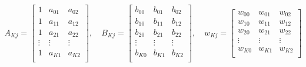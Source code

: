    \begin{align}
   A_{Kj} = \left[\begin{matrix}
   1 			& a_{01} 	& a_{02} \\
   1 			& a_{11} 	& a_{12} \\
   1 			& a_{21} 	& a_{22} \\
   \vdots 		& \vdots 	&  \vdots \\
   1 			& a_{K1} 	& a_{K2} \\
   \end{matrix}
   \right], \quad
      B_{Kj} = \left[\begin{matrix}
   b_{00}		& b_{01} 	& b_{02} \\
   b_{10}		& b_{11} 	& b_{12} \\
   b_{20}		& b_{21} 	& b_{22} \\
   \vdots 		& \vdots 	&  \vdots \\
   b_{K0}		& b_{K1} 	& b_{K2} \\
   \end{matrix}
   \right], \quad
      w_{Kj} = \left[\begin{matrix}
   w_{00}		& w_{01} 	& w_{02} \\
   w_{10}		& w_{11} 	& w_{12} \\
   w_{20}		& w_{21} 	& w_{22} \\
   \vdots 		& \vdots 	&  \vdots \\
   w_{K0}		& w_{K1} 	& w_{K2} \\
   \end{matrix}
   \right]
   \end{align}


